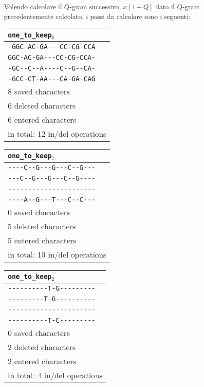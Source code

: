 \begin{example}
	Volendo calcolare il $Q$-gram successivo, $x[1 + Q]$ dato il $Q$-gram precedentemente calcolato, i passi da calcolare sono i seguenti:
	\begin{center}
		\begin{tabular}{l}
			\verb|one_to_keep|$_0$\\
			\toprule
			\verb|-GGC-AC-GA---CC-CG-CCA| \\
			\verb|GGC-AC-GA---CC-CG-CCA-| \\
			\verb|-GC--C--A----C--G--CA-| \\
			\verb|-GCC-CT-AA---CA-GA-CAG| \\
			\midrule
			8 saved characters \\
			6 deleted characters \\
			6 entered characters \\
			\midrule
			in total: 12 in/del operations \\
		\end{tabular}
		\hspace{\fill}
		\begin{tabular}{l}
			\verb|one_to_keep|$_1$\\
			\toprule
			\verb|----C--G---G---C--G---| \\
			\verb|---C--G---G---C--G----| \\
			\verb|----------------------| \\
			\verb|----A--G---T---C--C---| \\
			\midrule
			0 saved characters \\
			5 deleted characters \\
			5 entered characters \\
			\midrule
			in total: 10 in/del operations \\
		\end{tabular}
	\end{center}
	
	\begin{center}
		\begin{tabular}{l}
			\verb|one_to_keep|$_2$\\
			\toprule
			\verb|----------T-G---------| \\
			\verb|---------T-G----------| \\
			\verb|----------------------| \\
			\verb|----------T-C---------| \\
			\midrule
			0 saved characters \\
			2 deleted characters \\
			2 entered characters \\
			\midrule
			in total: 4 in/del operations \\
		\end{tabular}
	\end{center}
	

\end{example}
